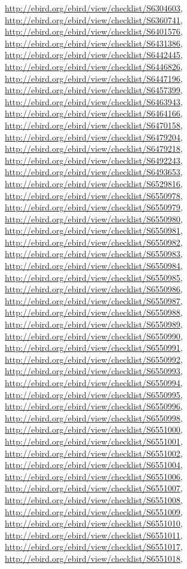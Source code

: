 \documentclass[9pt, article]{memoir}
\begin{document}
\begin{multicols}{2}
\url{http://ebird.org/ebird/view/checklist/S6304603}, 
\url{http://ebird.org/ebird/view/checklist/S6360741}, 
\url{http://ebird.org/ebird/view/checklist/S6401576}, 
\url{http://ebird.org/ebird/view/checklist/S6431386}, 
\url{http://ebird.org/ebird/view/checklist/S6442445}, 
\url{http://ebird.org/ebird/view/checklist/S6446826}, 
\url{http://ebird.org/ebird/view/checklist/S6447196}, 
\url{http://ebird.org/ebird/view/checklist/S6457399}, 
\url{http://ebird.org/ebird/view/checklist/S6463943}, 
\url{http://ebird.org/ebird/view/checklist/S6464166}, 
\url{http://ebird.org/ebird/view/checklist/S6470158}, 
\url{http://ebird.org/ebird/view/checklist/S6479204}, 
\url{http://ebird.org/ebird/view/checklist/S6479218}, 
\url{http://ebird.org/ebird/view/checklist/S6492243}, 
\url{http://ebird.org/ebird/view/checklist/S6493653}, 
\url{http://ebird.org/ebird/view/checklist/S6529816}, 
\url{http://ebird.org/ebird/view/checklist/S6550978}, 
\url{http://ebird.org/ebird/view/checklist/S6550979}, 
\url{http://ebird.org/ebird/view/checklist/S6550980}, 
\url{http://ebird.org/ebird/view/checklist/S6550981}, 
\url{http://ebird.org/ebird/view/checklist/S6550982}, 
\url{http://ebird.org/ebird/view/checklist/S6550983}, 
\url{http://ebird.org/ebird/view/checklist/S6550984}, 
\url{http://ebird.org/ebird/view/checklist/S6550985}, 
\url{http://ebird.org/ebird/view/checklist/S6550986}, 
\url{http://ebird.org/ebird/view/checklist/S6550987}, 
\url{http://ebird.org/ebird/view/checklist/S6550988}, 
\url{http://ebird.org/ebird/view/checklist/S6550989}, 
\url{http://ebird.org/ebird/view/checklist/S6550990}, 
\url{http://ebird.org/ebird/view/checklist/S6550991}, 
\url{http://ebird.org/ebird/view/checklist/S6550992}, 
\url{http://ebird.org/ebird/view/checklist/S6550993}, 
\url{http://ebird.org/ebird/view/checklist/S6550994}, 
\url{http://ebird.org/ebird/view/checklist/S6550995}, 
\url{http://ebird.org/ebird/view/checklist/S6550996}, 
\url{http://ebird.org/ebird/view/checklist/S6550998}, 
\url{http://ebird.org/ebird/view/checklist/S6551000}, 
\url{http://ebird.org/ebird/view/checklist/S6551001}, 
\url{http://ebird.org/ebird/view/checklist/S6551002}, 
\url{http://ebird.org/ebird/view/checklist/S6551004}, 
\url{http://ebird.org/ebird/view/checklist/S6551006}, 
\url{http://ebird.org/ebird/view/checklist/S6551007}, 
\url{http://ebird.org/ebird/view/checklist/S6551008}, 
\url{http://ebird.org/ebird/view/checklist/S6551009}, 
\url{http://ebird.org/ebird/view/checklist/S6551010}, 
\url{http://ebird.org/ebird/view/checklist/S6551011}, 
\url{http://ebird.org/ebird/view/checklist/S6551017}, 
\url{http://ebird.org/ebird/view/checklist/S6551018}, 

\end{multicols}
\end{document}
